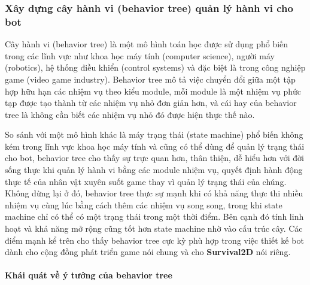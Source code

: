 \documentclass[12pt,a4paper]{article}
\begin{document}
  \subsubsection{Xây dựng cây hành vi (behavior tree) quản lý hành vi cho bot}
  Cây hành vi (behavior tree) là một mô hình toán học được sử dụng phổ biến trong các lĩnh vực như khoa học máy tính (computer science), người máy (robotics), hệ thống điều khiển (control systems) và đặc biệt là trong công nghiệp game (video game industry). Behavior tree mô tả việc chuyển đổi giữa một tập hợp hữu hạn các nhiệm vụ theo kiểu module, mỗi module là một nhiệm vụ phức tạp được tạo thành từ các nhiệm vụ nhỏ đơn giản hơn, và cái hay của behavior tree là không cần biết các nhiệm vụ nhỏ đó được hiện thực thế nào.
  
  So sánh với một mô hình khác là máy trạng thái (state machine)\cite{finite_state_machine} phổ biến không kém trong lĩnh vực khoa học máy tính và cũng có thể dùng để quản lý trạng thái cho bot, behavior tree cho thấy sự trực quan hơn, thân thiện, dễ hiểu hơn với đời sống thực khi quản lý hành vi bằng các module nhiệm vụ, quyết định hành động thực tế của nhân vật xuyên suốt game thay vì quản lý trạng thái của chúng. Không dừng lại ở đó, behavior tree thực sự mạnh khi có khả năng thực thi nhiều nhiệm vụ cùng lúc bằng cách thêm các nhiệm vụ song song, trong khi state machine chỉ có thể có một trạng thái trong một thời điểm. Bên cạnh đó tính linh hoạt và khả năng mở rộng cũng tốt hơn state machine nhờ vào cấu trúc cây. Các điểm mạnh kể trên cho thấy behavior tree cực kỳ phù hợp trong việc thiết kế bot dành cho cộng đồng phát triển game nói chung và cho \textbf{Survival2D} nói riêng.\cite{behavior_tree_wiki}

  \paragraph{Khái quát về ý tưởng của behavior tree}\mbox{}
\end{document}
